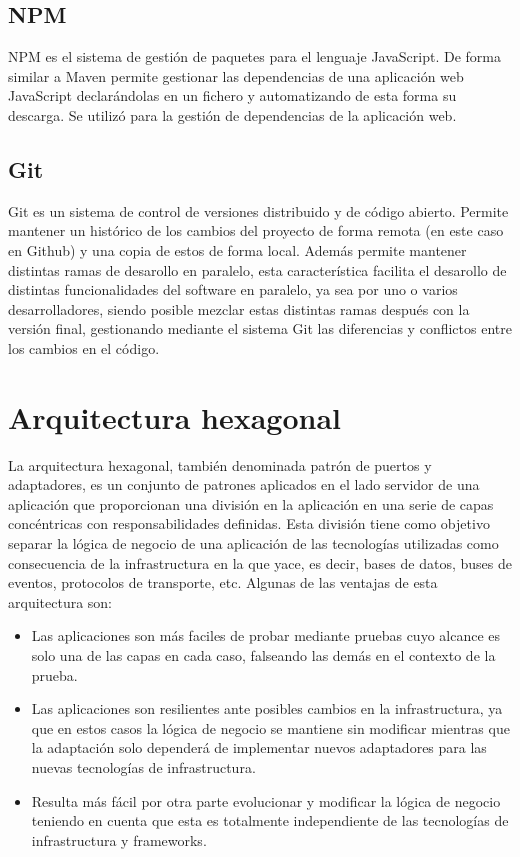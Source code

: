 \documentclass[a4paper, 12pt]{book}
\begin{document}
    \subsection{NPM}
    \label{subsec:intro_tools_npm}
    NPM es el sistema de gestión de paquetes para el lenguaje JavaScript. De forma similar a Maven permite gestionar las dependencias de una aplicación web JavaScript declarándolas en un fichero y automatizando de esta forma su descarga. Se utilizó para la gestión de dependencias de la aplicación web.

    \subsection{Git}
    \label{subsec:intro_tools_git}
    Git es un sistema de control de versiones distribuido y de código abierto. Permite mantener un histórico de los cambios del proyecto de forma remota (en este caso en Github) y una copia de estos de forma local. Además permite mantener distintas ramas de desarollo en paralelo, esta característica facilita el desarollo de distintas funcionalidades del software en paralelo, ya sea por uno o varios desarrolladores, siendo posible mezclar estas distintas ramas después con la versión final, gestionando mediante el sistema Git las diferencias y conflictos entre los cambios en el código.


    \section{Arquitectura hexagonal}
    \label{sec:intro_desc_hexagonal_arch}

    La arquitectura hexagonal, también denominada patrón de puertos y adaptadores, es un conjunto de patrones aplicados en el lado servidor de una aplicación
    que proporcionan una división en la aplicación en una serie de capas concéntricas con responsabilidades definidas.
    Esta división tiene como objetivo separar la lógica de negocio de una aplicación de las tecnologías utilizadas como consecuencia de la infrastructura en la que yace,
    es decir, bases de datos, buses de eventos, protocolos de transporte, etc. Algunas de las ventajas de esta arquitectura son:
    \begin{itemize}
        \item Las aplicaciones son más faciles de probar mediante pruebas cuyo alcance es
        solo una de las capas en cada caso, falseando las demás en el contexto de la prueba.
        \item Las aplicaciones son resilientes ante posibles cambios en la infrastructura, ya que en estos casos la lógica de negocio se mantiene sin modificar
        mientras que la adaptación solo dependerá de implementar nuevos adaptadores para las nuevas tecnologías de infrastructura.
        \item Resulta más fácil por otra parte evolucionar y modificar la lógica de negocio teniendo en cuenta que esta es totalmente independiente de las tecnologías
        de infrastructura y frameworks.
    \end{itemize}
\end{document}
